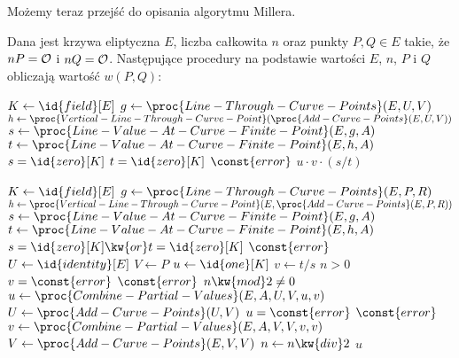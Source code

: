 Możemy teraz przejść do opisania algorytmu Millera.

\begin{algorithm}
Dana jest krzywa eliptyczna $E$,
liczba całkowita $n$
oraz punkty $P, Q \in E$ takie, że $nP = \mathcal{O}$ i $nQ = \mathcal{O}$.
Następujące procedury
na podstawie wartości $E$, $n$, $P$ i $Q$
obliczają
wartość $w(P, Q)$:

\begin{codebox}
\li
    $K \gets \id{field}[E]$
\li
    $g \gets \proc{Line-Through-Curve-Points}(E, U, V)$
\li
    $h \gets \proc{Vertical-Line-Through-Curve-Point}(\proc{Add-Curve-Points}(E, U, V))$
\li
    $s \gets \proc{Line-Value-At-Curve-Finite-Point}(E, g, A)$
\li
    $t \gets \proc{Line-Value-At-Curve-Finite-Point}(E, h, A)$
\li
    \If $s = \id{zero}[K]$  $t = \id{zero}[K]$
\li
        \Then \Return $\const{error}$
    \End
\li
    \Return $u \cdot v \cdot (s / t)$
\end{codebox}

\begin{codebox}
\li
    $K \gets \id{field}[E]$
\li
    $g \gets \proc{Line-Through-Curve-Points}(E, P, R)$
\li
    $h \gets \proc{Vertical-Line-Through-Curve-Point}(E, \proc{Add-Curve-Points}(E, P, R))$
\li
    $s \gets \proc{Line-Value-At-Curve-Finite-Point}(E, g, A)$
\li
    $t \gets \proc{Line-Value-At-Curve-Finite-Point}(E, h, A)$
\li
    \If $s = \id{zero}[K] \kw{ or } t = \id{zero}[K]$
\li
    \Then
        \Return $\const{error}$
    \End
\li
    $U \gets \id{identity}[E]$
\li
    $V \gets P$
\li
    $u \gets \id{one}[K]$
\li
    $v \gets t / s$
\li
    \While $n > 0$
\li
        \Do
            \If $v = \const{error}$
\li
                \Then
                    \Return $\const{error}$
                \End
\li
            \If $n \kw{ mod } 2 \neq 0$
\li
                \Then
                    $u \gets \proc{Combine-Partial-Values}(E, A, U, V, u, v)$
\li
                    $U \gets \proc{Add-Curve-Points}(U, V)$
\li
                    \If $u = \const{error}$
\li
                        \Then
                            \Return $\const{error}$
                        \End
                \End
\li
            $v \gets \proc{Combine-Partial-Values}(E, A, V, V, v, v)$
\li
            $V \gets \proc{Add-Curve-Points}(E, V, V)$
\li
            $n \gets n \kw{ div } 2$
        \End
\li
    \Return $u$
\end{codebox}


\end{algorithm}
